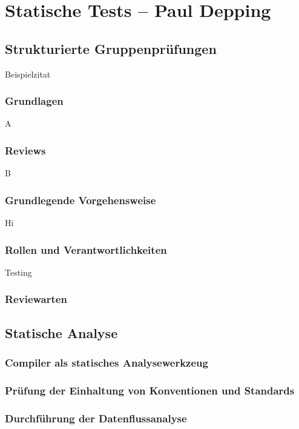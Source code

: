 \documentclass[	%
		fontsize=11pt,  %
		a4paper,	    %
		german,		%
		sans,			%
		f4,				%
	]{HsH-report}		%
\begin{document}
\chapter{Statische Tests -- Paul Depping} \label{chap: static}
	\section{Strukturierte Gruppenprüfungen}
		Beispielzitat \cite{fagan:advances}
		\subsection{Grundlagen}
			A \cite{dpunkt:basiswissensoftwaretest}
			\lipsum[1]
		\subsection{Reviews}
			B \cite{fagan:design}
			\lipsum[1]
		\subsection{Grundlegende Vorgehensweise}
			Hi \cite{freedman:reviews}
			\lipsum[1]
		\subsection{Rollen und Verantwortlichkeiten}
			Testing \cite{hanser:qualität}
			\lipsum[1]
		\subsection{Reviewarten}
	\section{Statische Analyse}
		\lipsum[1-2]
		\subsection{Compiler als statisches Analysewerkzeug}
			\lipsum[1]
		\subsection{Prüfung der Einhaltung von Konventionen und Standards}
			\lipsum[1]
		\subsection{Durchführung der Datenflussanalyse}
			\lipsum[1]
\end{document}
